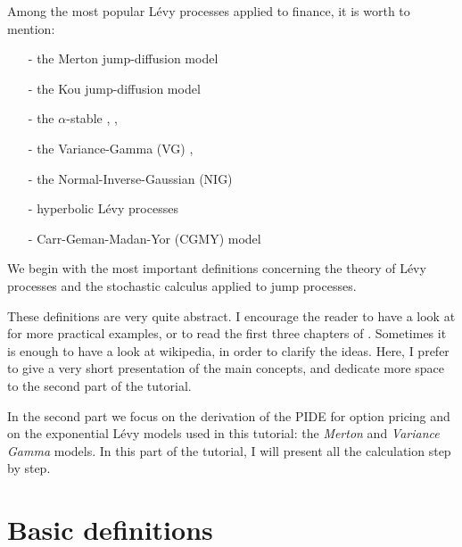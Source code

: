 \documentclass[a4paper,10pt]{article}
\begin{document}
Among the most popular Lévy processes applied to finance, it is worth to mention:
\begin{itemize}
 \item[-] the Merton jump-diffusion model \cite{Me76}
 \item[-] the Kou jump-diffusion model \cite{Kou02}
 \item[-] the $\alpha$-stable \cite{Ma63}, \cite{BoPoCo97}, \cite{alpha09}
 \item[-] the Variance-Gamma (VG) \cite{MaSe90}, \cite{MCC98}
 \item[-] the Normal-Inverse-Gaussian (NIG) \cite{BN97}
 \item[-] hyperbolic Lévy processes \cite{EbKe95}
 \item[-] Carr-Geman-Madan-Yor (CGMY) model \cite{CGMY02}
\end{itemize}

We begin with the most important definitions concerning the theory of Lévy processes and the stochastic calculus applied to jump processes.

These definitions are very quite abstract. I encourage the reader to have a look at \cite{papapa} for more practical examples, or to read 
the first three chapters of \cite{Cont}. Sometimes it is enough to have a look at wikipedia, in order to clarify the ideas.
Here, I prefer to give a very short presentation of the main concepts, and dedicate more space to the second part of the tutorial.

In the second part we focus on the derivation of the PIDE for option pricing and on the exponential Lévy models used in this tutorial: 
the \emph{Merton} and \emph{Variance Gamma} models.
In this part of the tutorial, I will present all the calculation step by step. 



\section{Basic definitions}
\end{document}
